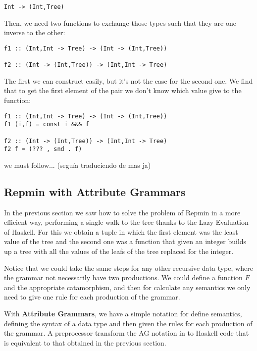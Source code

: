\documentclass[a4paper,10pt]{article}
\begin{document}
\begin{lstlisting}
Int -> (Int,Tree)
\end{lstlisting} 

Then, we need two functions to exchange those types such that they are one inverse to the other:
  
\begin{lstlisting}
f1 :: (Int,Int -> Tree) -> (Int -> (Int,Tree))
  
f2 :: (Int -> (Int,Tree)) -> (Int,Int -> Tree)
\end{lstlisting}

The first we can construct easily, but it's not the case for the second one. We find that to
get the first element of the pair we don't know which value give to the function:

\begin{lstlisting}
f1 :: (Int,Int -> Tree) -> (Int -> (Int,Tree))
f1 (i,f) = const i &&& f

f2 :: (Int -> (Int,Tree)) -> (Int,Int -> Tree)
f2 f = (??? , snd . f)
\end{lstlisting}

we must follow... (seguía traduciendo de mas ja)


\subsection{Repmin with Attribute Grammars}

In the previous section we saw how to solve the problem of Repmin in a more efficient way, performing
a single walk to the tree thanks to the Lazy Evaluation of Haskell. For this we obtain a tuple in
which the first element was the least value of the tree and the second one was a function that
given an integer builds up a tree with all the values of the leafs of the tree replaced for
the integer.

Notice that we could take the same steps for any other recursive data type, where the grammar
not necessarily have two productions. We could define a function $F$ and the appropriate catamorphism,
and then for calculate any semantics we only need to give one rule for each production of the
grammar.

With \textbf{Attribute Grammars}, we have a simple notation for define semantics, defining the
syntax of a data type and then given the rules for each production of the grammar. A preprocessor
transform the AG notation in to Haskell code that is equivalent to that obtained in the previous
section.
\end{document}
